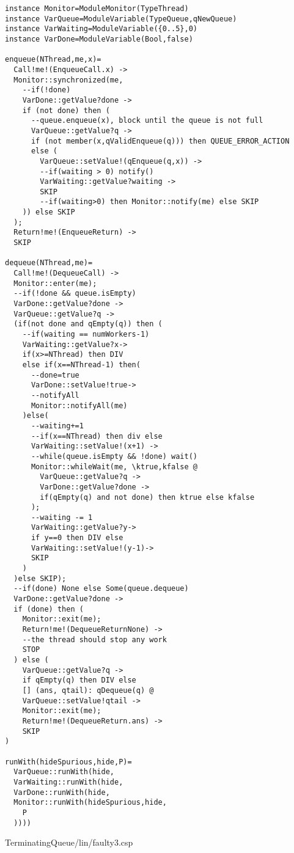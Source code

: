 \begin{lstlisting}
instance Monitor=ModuleMonitor(TypeThread)
instance VarQueue=ModuleVariable(TypeQueue,qNewQueue)
instance VarWaiting=ModuleVariable({0..5},0)
instance VarDone=ModuleVariable(Bool,false)

enqueue(NThread,me,x)=
  Call!me!(EnqueueCall.x) ->
  Monitor::synchronized(me,
    --if(!done)
    VarDone::getValue?done ->
    if (not done) then (
      --queue.enqueue(x), block until the queue is not full
      VarQueue::getValue?q ->
      if (not member(x,qValidEnqueue(q))) then QUEUE_ERROR_ACTION
      else (
        VarQueue::setValue!(qEnqueue(q,x)) ->
        --if(waiting > 0) notify()
        VarWaiting::getValue?waiting ->
        SKIP
        --if(waiting>0) then Monitor::notify(me) else SKIP
    )) else SKIP
  );
  Return!me!(EnqueueReturn) ->
  SKIP
  
dequeue(NThread,me)=
  Call!me!(DequeueCall) ->
  Monitor::enter(me);
  --if(!done && queue.isEmpty)
  VarDone::getValue?done ->
  VarQueue::getValue?q ->
  (if(not done and qEmpty(q)) then (
    --if(waiting == numWorkers-1)
    VarWaiting::getValue?x->
    if(x>=NThread) then DIV
    else if(x==NThread-1) then(
      --done=true
      VarDone::setValue!true->
      --notifyAll
      Monitor::notifyAll(me)
    )else(
      --waiting+=1
      --if(x==NThread) then div else
      VarWaiting::setValue!(x+1) ->
      --while(queue.isEmpty && !done) wait()
      Monitor::whileWait(me, \ktrue,kfalse @
        VarQueue::getValue?q ->
        VarDone::getValue?done ->
        if(qEmpty(q) and not done) then ktrue else kfalse
      );
      --waiting -= 1
      VarWaiting::getValue?y->
      if y==0 then DIV else 
      VarWaiting::setValue!(y-1)->
      SKIP
    )
  )else SKIP);
  --if(done) None else Some(queue.dequeue)
  VarDone::getValue?done ->
  if (done) then (
    Monitor::exit(me);
    Return!me!(DequeueReturnNone) ->
    --the thread should stop any work
    STOP
  ) else (
    VarQueue::getValue?q ->
    if qEmpty(q) then DIV else
    [] (ans, qtail): qDequeue(q) @
    VarQueue::setValue!qtail ->
    Monitor::exit(me);
    Return!me!(DequeueReturn.ans) ->
    SKIP
)

runWith(hideSpurious,hide,P)=
  VarQueue::runWith(hide,
  VarWaiting::runWith(hide,
  VarDone::runWith(hide,
  Monitor::runWith(hideSpurious,hide,
    P
  ))))
\end{lstlisting}
TerminatingQueue/lin/faulty3.csp

